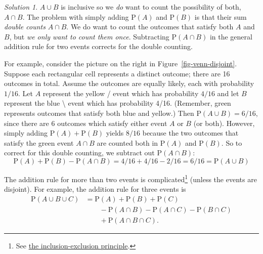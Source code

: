\documentclass[
  letterpaper,
  DIV=11,
  numbers=noendperiod]{scrreprt}
\theoremstyle{plain}
\theoremstyle{definition}
\theoremstyle{definition}
\theoremstyle{definition}
\theoremstyle{remark}
\newtheorem{refsolution}{Solution}[chapter]
\begin{document}
\begin{tcolorbox}[enhanced jigsaw, opacityback=0, rightrule=.15mm, coltitle=black, colframe=quarto-callout-tip-color-frame, toprule=.15mm, colbacktitle=quarto-callout-tip-color!10!white, opacitybacktitle=0.6, left=2mm, toptitle=1mm, breakable, title={Solution (click to expand)}, bottomtitle=1mm, colback=white, leftrule=.75mm, titlerule=0mm, arc=.35mm, bottomrule=.15mm]

\begin{refsolution}
\(A\cup B\) is inclusive so we \emph{do} want to count the possibility
of both, \(A\cap B\). The problem with simply adding \(\textrm{P}(A)\)
and \(\textrm{P}(B)\) is that their sum \emph{double counts}
\(A \cap B\). We do want to count the outcomes that satisfy both \(A\)
and \(B\), but \emph{we only want to count them once}. Subtracting
\(\textrm{P}(A \cap B)\) in the general addition rule for two events
corrects for the double counting.

For example, consider the picture on the right in
Figure~\ref{fig-venn-disjoint}. Suppose each rectangular cell represents
a distinct outcome; there are 16 outcomes in total. Assume the outcomes
are equally likely, each with probability \(1/16\). Let \(A\) represent
the yellow / event which has probability \(4/16\) and let \(B\)
represent the blue \textbackslash{} event which has probability 4/16.
(Remember, green represents outcomes that satisfy both blue and yellow.)
Then \(\textrm{P}(A\cup B) = 6/16\), since there are 6 outcomes which
satisfy either event \(A\) or \(B\) (or both). However, simply adding
\(\textrm{P}(A)+\textrm{P}(B)\) yields \(8/16\) because the two outcomes
that satisfy the green event \(A\cap B\) are counted both in
\(\textrm{P}(A)\) and \(\textrm{P}(B)\). So to correct for this double
counting, we subtract out \(\textrm{P}(A\cap B)\): \[
\textrm{P}(A)+\textrm{P}(B)-\textrm{P}(A\cap B) = 4/16 + 4/16 -2/16 = 6/16 = \textrm{P}(A\cup B)
\]

\label{sol-dd-union}

\end{refsolution}

\end{tcolorbox}

The addition rule for more than two events is complicated\footnote{See
  \href{https://en.wikipedia.org/wiki/Inclusion\%E2\%80\%93exclusion_principle\#In_probability}{the
  inclusion-exclusion principle}.} (unless the events are disjoint). For
example, the addition rule for three events is \begin{align*}
    \textrm{P}(A\cup B\cup C) & = \textrm{P}(A) + \textrm{P}(B) + \textrm{P}(C)\\
    & \qquad - \textrm{P}(A\cap B) - \textrm{P}(A \cap C) - \textrm{P}(B \cap C)\\
    & \qquad + \textrm{P}(A \cap B \cap C).
\end{align*}
\end{document}
